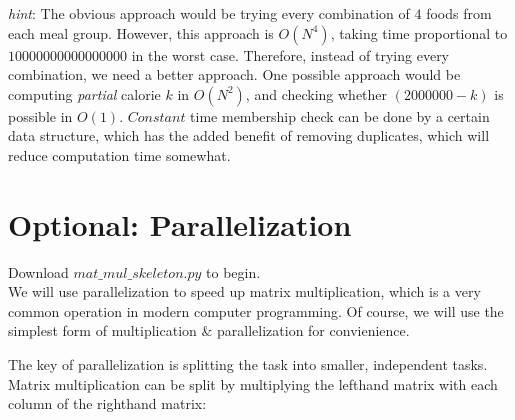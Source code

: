 \documentclass{article}
\begin{document}
\textit{hint}: The obvious approach would be trying every combination
of $4$ foods from each meal group. However, this approach is $O(N^4)$,
taking time proportional to $10000000000000000$ in the worst case.
Therefore, instead of trying every combination, we need a better approach.
One possible approach would be computing \textit{partial} calorie $k$ in
$O(N^2)$, and checking whether $(2000000-k)$ is possible in $O(1)$.
$Constant$ time membership check can be done by a certain data structure, which
has the added benefit of removing duplicates, which will reduce computation
time somewhat.\\


\section{Optional: Parallelization}
Download $mat\_mul\_skeleton.py$ to begin.\\
We will use parallelization to speed up matrix multiplication, which is a very
common operation in modern computer programming. Of course, we will use the
simplest form of multiplication \& parallelization for convienience.

The key of parallelization is splitting the task into smaller, independent
tasks. Matrix multiplication can be split by multiplying the lefthand matrix with
each column of the righthand matrix:
\end{document}
